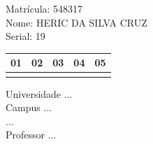 \documentclass[10pt,a4paper,twocolumn]{report}
\begin{document}
Matrícula: 548317\\ Nome: HERIC DA SILVA CRUZ \\ Serial: 19\\
\begin{tabular}{|l|l|l|l|l|}\hline
01  &02  &03  &04  &05 \\ \hline 
 & & & & \\ \hline 
\end{tabular}
 \cleardoublepage 

\begin{flushleft}
Universidade ...\\
Campus ...\\
...\\
Professor ...\\
\end{flushleft}
\end{document}

